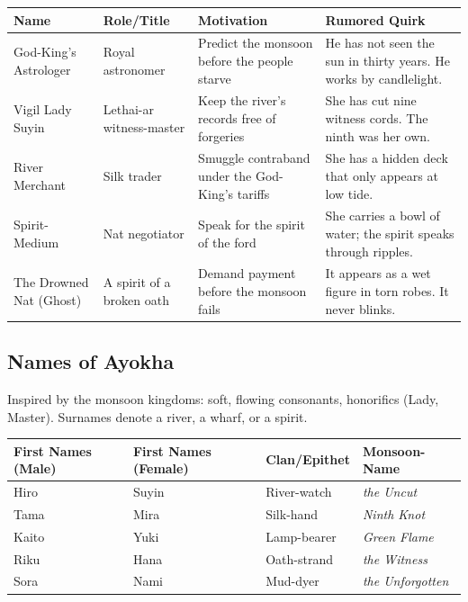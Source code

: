 \begin{longtable}{|p{}|p{}|p{}|p{}|}
\hline
\textbf{Name} & \textbf{Role/Title} & \textbf{Motivation} & \textbf{Rumored Quirk} \\
\hline
God-King's Astrologer & Royal astronomer & Predict the monsoon before the people starve & He has not seen the sun in thirty years. He works by candlelight. \\
\hline
Vigil Lady Suyin & Lethai-ar witness-master & Keep the river's records free of forgeries & She has cut nine witness cords. The ninth was her own. \\
\hline
River Merchant & Silk trader & Smuggle contraband under the God-King's tariffs & She has a hidden deck that only appears at low tide. \\
\hline
Spirit-Medium & Nat negotiator & Speak for the spirit of the ford & She carries a bowl of water; the spirit speaks through ripples. \\
\hline
The Drowned Nat (Ghost) & A spirit of a broken oath & Demand payment before the monsoon fails & It appears as a wet figure in torn robes. It never blinks. \\
\hline
\end{longtable}

\subsection*{Names of Ayokha}
\label{sec:ayokha-names}

Inspired by the monsoon kingdoms: soft, flowing consonants, honorifics (Lady, Master). Surnames denote a river, a wharf, or a spirit.

\begin{longtable}{|p{}|p{}|p{}|p{}|}
\hline
\textbf{First Names (Male)} & \textbf{First Names (Female)} & \textbf{Clan/Epithet} & \textbf{Monsoon-Name} \\
\hline
Hiro & Suyin & River-watch & \textit{the Uncut} \\
\hline
Tama & Mira & Silk-hand & \textit{Ninth Knot} \\
\hline
Kaito & Yuki & Lamp-bearer & \textit{Green Flame} \\
\hline
Riku & Hana & Oath-strand & \textit{the Witness} \\
\hline
Sora & Nami & Mud-dyer & \textit{the Unforgotten} \\
\hline
\end{longtable}

